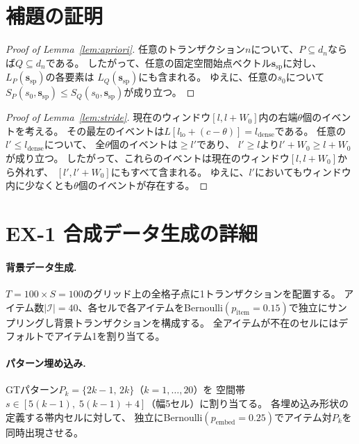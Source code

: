 \section{補題の証明}
\label{sec:proofs}

\begin{proof}[Proof of Lemma~\ref{lem:apriori}]
任意のトランザクション$n$について、$P \subseteq d_n$ならば$Q \subseteq d_n$である。
したがって、任意の固定空間始点ベクトル$\bm{s}_{\mathrm{sp}}$に対し、
$L_P(\bm{s}_{\mathrm{sp}})$の各要素は
$L_Q(\bm{s}_{\mathrm{sp}})$にも含まれる。
ゆえに、任意の$s_0$について
$S_P(s_0,\bm{s}_{\mathrm{sp}}) \leq S_Q(s_0,\bm{s}_{\mathrm{sp}})$が成り立つ。
\end{proof}

\begin{proof}[Proof of Lemma~\ref{lem:stride}]
現在のウィンドウ$[l, l+W_0]$内の右端$\theta$個のイベントを考える。
その最左のイベントは$L[l_{\mathrm{lo}} + (c-\theta)] = l_{\mathrm{dense}}$である。
任意の$l' \leq l_{\mathrm{dense}}$について、
全$\theta$個のイベントは$\geq l'$であり、
$l' \geq l$より$l'+W_0 \geq l+W_0$が成り立つ。
したがって、これらのイベントは現在のウィンドウ$[l,l+W_0]$から外れず、
$[l', l'+W_0]$にもすべて含まれる。
ゆえに、$l'$においてもウィンドウ内に少なくとも$\theta$個のイベントが存在する。
\end{proof}


\section{EX-1 合成データ生成の詳細}
\label{sec:ex1_data_details}

\paragraph{背景データ生成.}
$T{=}100 \times S{=}100$のグリッド上の全格子点に1トランザクションを配置する。
アイテム数$|\mathcal{I}|{=}40$、各セルで各アイテムをBernoulli$(p_{\mathrm{item}}{=}0.15)$で独立にサンプリングし背景トランザクションを構成する。
全アイテムが不在のセルにはデフォルトでアイテム1を割り当てる。

\paragraph{パターン埋め込み.}
GTパターン$P_k = \{2k{-}1,\, 2k\}$（$k=1,\ldots,20$）を
空間帯$s \in [5(k{-}1),\; 5(k{-}1){+}4]$（幅5セル）に割り当てる。
各埋め込み形状の定義する帯内セルに対して、
独立にBernoulli$(p_{\mathrm{embed}}{=}0.25)$でアイテム対$P_k$を同時出現させる。

